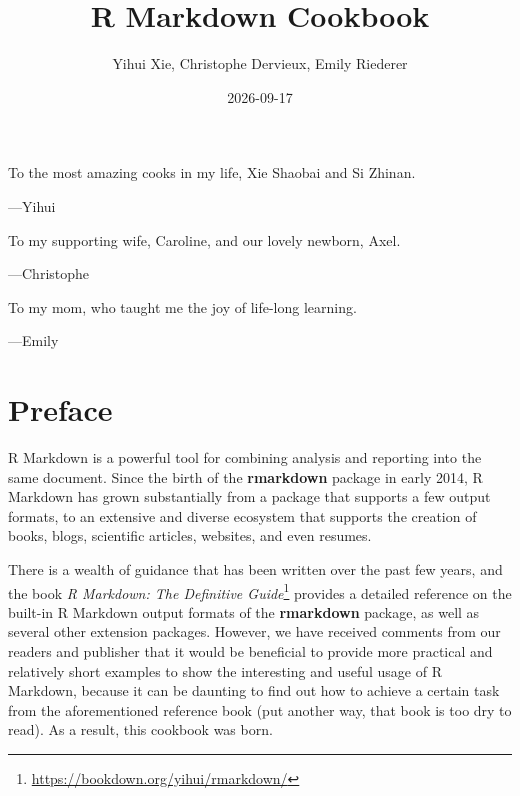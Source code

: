 \documentclass[
  11pt,
]{krantz}
\title{R Markdown Cookbook}
\author{Yihui Xie, Christophe Dervieux, Emily Riederer}
\date{2026-09-17}
\renewcommand{\href}[2]{#2\footnote{\url{#1}}}
\begin{document}
\maketitle

\cleardoublepage\newpage\thispagestyle{empty}\null
\cleardoublepage\newpage\thispagestyle{empty}\null
\thispagestyle{empty}
\begin{large}
To the most amazing cooks in my life, Xie Shaobai and Si Zhinan.
\begin{flushright}
---Yihui
\end{flushright}

\bigskip

To my supporting wife, Caroline, and our lovely newborn, Axel.
\begin{flushright}
---Christophe
\end{flushright}

\bigskip

To my mom, who taught me the joy of life-long learning.
\begin{flushright}
---Emily
\end{flushright}
\end{large}

\setlength{\abovedisplayskip}{-5pt}
\setlength{\abovedisplayshortskip}{-5pt}

{
\hypersetup{linkcolor=}
\setcounter{tocdepth}{2}
\tableofcontents
}
\listoffigures
\listoftables
\hypertarget{preface}{%
\chapter*{Preface}\label{preface}}


R Markdown is a powerful tool for combining analysis and reporting into the same document. Since the birth of the \textbf{rmarkdown} package \citep{R-rmarkdown} in early 2014, R Markdown has grown substantially from a package that supports a few output formats, to an extensive and diverse ecosystem that supports the creation of books, blogs, scientific articles, websites, and even resumes.

There is a wealth of guidance that has been written over the past few years, and the book \href{https://bookdown.org/yihui/rmarkdown/}{\emph{R Markdown: The Definitive Guide}} \citep{rmarkdown2018} provides a detailed reference on the built-in R Markdown output formats of the \textbf{rmarkdown} package, as well as several other extension packages. However, we have received comments from our readers and publisher that it would be beneficial to provide more practical and relatively short examples to show the interesting and useful usage of R Markdown, because it can be daunting to find out how to achieve a certain task from the aforementioned reference book (put another way, that book is too dry to read). As a result, this cookbook was born.
\end{document}
